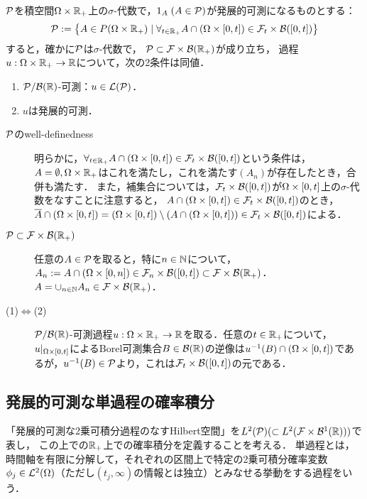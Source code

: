 \documentclass[uplatex,dvipdfmx]{jsreport}
\begin{document}
\begin{lemma}[発展的可測性の特徴付け]
    $\P$を積空間$\Om\times\R_+$上の$\sigma$-代数で，$1_A\;(A\in\P)$が発展的可測になるものとする：
    \[\P:=\Brace{A\in P(\Om\times\R_+)\mid\forall_{t\in\R_+} A\cap(\Om\times[0,t])\in\F_t\times\B([0,t])}\]
    すると，確かに$\P$は$\sigma$-代数で，
    $\P\subset\F\times\B(\R_+)$が成り立ち，
    過程$u:\Om\times\R_+\to\R$について，次の2条件は同値．
    \begin{enumerate}
        \item $\P/\B(\R)$-可測：$u\in\L(\P)$．
        \item $u$は発展的可測．
    \end{enumerate}
\end{lemma}
\begin{Proof}\mbox{}
    \begin{description}
        \item[$\P$のwell-definedness] 明らかに，$\forall_{t\in\R_+} A\cap(\Om\times[0,t])\in\F_t\times\B([0,t])$という条件は，$A=\emptyset,\Om\times\R_+$はこれを満たし，これを満たす$(A_n)$が存在したとき，合併も満たす．
        また，補集合については，$\F_t\times\B([0,t])$が$\Om\times[0,t]$上の$\sigma$-代数をなすことに注意すると，
        $A\cap(\Om\times[0,t])\in\F_t\times\B([0,t])$のとき，
        $\o{A}\cap(\Om\times[0,t])=(\Om\times[0,t])\setminus (A\cap(\Om\times[0,t]))\in\F_t\times\B([0,t])$による．
        \item[$\P\subset\F\times\B(\R_+)$] 
        任意の$A\in\P$を取ると，特に$n\in\N$について，$A_n:=A\cap(\Om\times[0,n])\in\F_n\times\B([0,t])\subset\F\times\B(\R_+)$．
        $A=\cup_{n\in\N}A_n\in\F\times\B(\R_+)$．
        \item[(1)$\Leftrightarrow$(2)] $\P/\B(\R)$-可測過程$u:\Om\times\R_+\to\R$を取る．任意の$t\in\R_+$について，$u|_{\Om\times[0,t]}$によるBorel可測集合$B\in\B(\R)$の逆像は$u^{-1}(B)\cap(\Om\times[0,t])$であるが，$u^{-1}(B)\in\P$より，これは$\F_t\times\B([0,t])$の元である．
    \end{description}
\end{Proof}

\subsection{発展的可測な単過程の確率積分}

\begin{tcolorbox}[colframe=ForestGreen, colback=ForestGreen!10!white,breakable,colbacktitle=ForestGreen!40!white,coltitle=black,fonttitle=\bfseries\sffamily,
title=]
    「発展的可測な2乗可積分過程のなすHilbert空間」を$L^2(\P)(\subset L^2(\F\times\B^1(\R)))$で表し，
    この上での$\R_+$上での確率積分を定義することを考える．
    単過程とは，時間軸を有限に分解して，それぞれの区間上で特定の2乗可積分確率変数$\phi_j\in\L^2(\Om)$（ただし$(t_j,\infty)$の情報とは独立）とみなせる挙動をする過程をいう．
\end{tcolorbox}
\end{document}
